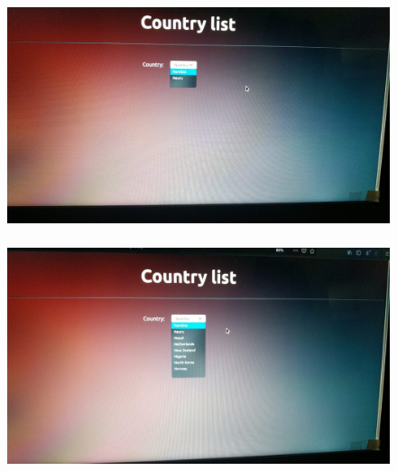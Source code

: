 \documentclass[12pt,letterpaper]{article}
\begin{document}
\subsubsection*{}
\begin{flushleft}

\end{flushleft}

\newpage
\subsection*{}
\subsubsection*{}
\begin{figure}[h]
    \centering
    \includegraphics[width = \textwidth]{Pics/op1.jpeg}
\end{figure}
\newpage
\subsubsection*{}
\begin{figure}[h!]
    \centering
    \includegraphics[width = \textwidth]{Pics/op2.jpeg}
\end{figure}
\newpage
\end{document}
